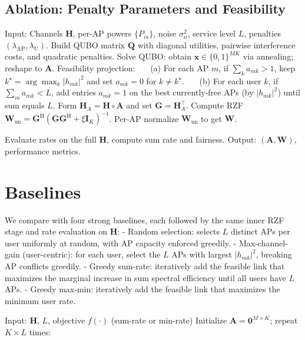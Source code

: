 {\begin{algorithm}[htbp]
\subsection{Ablation: Penalty Parameters and Feasibility}
\caption{Two-Level QUBO-RZF with Feasibility Projection}
\begin{algorithmic}[1]
\State Input: Channels $\mathbf{H}$, per-AP powers $\{P_m\}$, noise $\sigma_n^2$, service level $L$, penalties $(\lambda_{\text{AP}},\lambda_{\text{U}})$.
\State Build QUBO matrix $\mathbf{Q}$ with diagonal utilities, pairwise interference costs, and quadratic penalties.
\State Solve QUBO: obtain $\mathbf{x}\in\{0,1\}^{MK}$ via annealing; reshape to $\mathbf{A}$.
\State Feasibility projection:
\State ~~~(a) For each AP $m$, if $\sum_k a_{mk}>1$, keep $k^\star=\arg\max_k |h_{mk}|^2$ and set $a_{mk}=0$ for $k\neq k^\star$.
\State ~~~(b) For each user $k$, if $\sum_m a_{mk}<L$, add entries $a_{mk}=1$ on the best currently-free APs (by $|h_{mk}|^2$) until sum equals $L$.
\State Form $\mathbf{H}_A=\mathbf{H}\circ \mathbf{A}$ and set $\mathbf{G}=\mathbf{H}_A^\top$.
\State Compute RZF $\mathbf{W}_{\mathrm{un}}=\mathbf{G}^\mathrm{H}(\mathbf{G}\mathbf{G}^\mathrm{H}+\xi \mathbf{I}_K)^{-1}$.
\State Per-AP normalize $\mathbf{W}_{\mathrm{un}}$ to get $\mathbf{W}$.

\State Evaluate rates on the full $\mathbf{H}$, compute sum rate and fairness.
\State Output: $(\mathbf{A},\mathbf{W})$, performance metrics.
\end{algorithmic}
\end{algorithm}

\section{Baselines}
We compare with four strong baselines, each followed by the same inner RZF stage and rate evaluation on $\mathbf{H}$:
- Random selection: selects $L$ distinct APs per user uniformly at random, with AP capacity enforced greedily.
- Max-channel-gain (user-centric): for each user, select the $L$ APs with largest $|h_{mk}|^2$, breaking AP conflicts greedily.
- Greedy sum-rate: iteratively add the feasible link that maximizes the marginal increase in sum spectral efficiency until all users have $L$ APs.
- Greedy max-min: iteratively add the feasible link that maximizes the minimum user rate.

\begin{algorithm}[htbp]
\caption{Greedy Sum-Rate and Greedy Max-Min (Selection Only)}
\begin{algorithmic}[1]
\State Input: $\mathbf{H}$, $L$, objective $f(\cdot)$ (sum-rate or min-rate)
\State Initialize $\mathbf{A}=\mathbf{0}^{M\times K}$; repeat $K\!\times\!L$ times:


\end{algorithmic}
\end{algorithm}}
